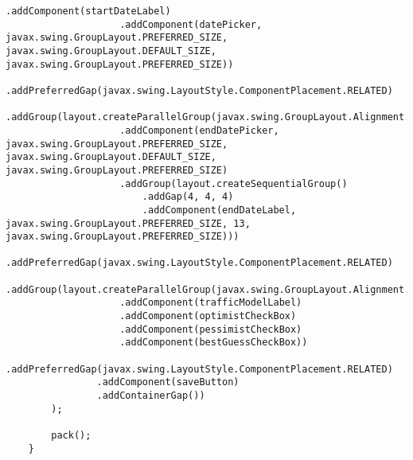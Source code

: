 \begin{lstlisting}[caption= main.java]
                    .addComponent(startDateLabel)
                    .addComponent(datePicker, javax.swing.GroupLayout.PREFERRED_SIZE, javax.swing.GroupLayout.DEFAULT_SIZE, javax.swing.GroupLayout.PREFERRED_SIZE))
                .addPreferredGap(javax.swing.LayoutStyle.ComponentPlacement.RELATED)
                .addGroup(layout.createParallelGroup(javax.swing.GroupLayout.Alignment.LEADING)
                    .addComponent(endDatePicker, javax.swing.GroupLayout.PREFERRED_SIZE, javax.swing.GroupLayout.DEFAULT_SIZE, javax.swing.GroupLayout.PREFERRED_SIZE)
                    .addGroup(layout.createSequentialGroup()
                        .addGap(4, 4, 4)
                        .addComponent(endDateLabel, javax.swing.GroupLayout.PREFERRED_SIZE, 13, javax.swing.GroupLayout.PREFERRED_SIZE)))
                .addPreferredGap(javax.swing.LayoutStyle.ComponentPlacement.RELATED)
                .addGroup(layout.createParallelGroup(javax.swing.GroupLayout.Alignment.BASELINE)
                    .addComponent(trafficModelLabel)
                    .addComponent(optimistCheckBox)
                    .addComponent(pessimistCheckBox)
                    .addComponent(bestGuessCheckBox))
                .addPreferredGap(javax.swing.LayoutStyle.ComponentPlacement.RELATED)
                .addComponent(saveButton)
                .addContainerGap())
        );

        pack();
    }                      


\end{lstlisting}
